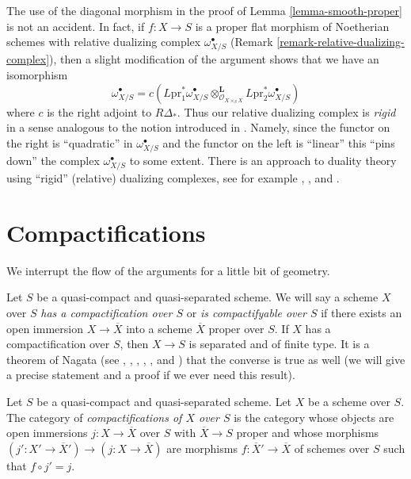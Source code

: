 \begin{remark}
\label{remark-van-den-bergh}
The use of the diagonal morphism in the proof of
Lemma \ref{lemma-smooth-proper} is not an accident.
In fact, if $f : X \to S$ is a proper flat morphism of
Noetherian schemes with relative
dualizing complex $\omega_{X/S}^\bullet$
(Remark \ref{remark-relative-dualizing-complex}), then
a slight modification of the argument shows that
we have
an isomorphism
$$
\omega_{X/S}^\bullet =
c\left(L\text{pr}_1^*\omega_{X/S}^\bullet
\otimes_{\mathcal{O}_{X \times_S X}}^\mathbf{L}
L\text{pr}_2^*\omega_{X/S}^\bullet\right)
$$
where $c$ is the right adjoint to $R\Delta_*$. Thus our relative dualizing
complex is {\it rigid} in a sense analogous to the notion introduced
in \cite{vdB-rigid}. Namely, since the functor on the right
is ``quadratic'' in $\omega_{X/S}^\bullet$ and the functor on the left
is ``linear'' this ``pins down'' the complex $\omega_{X/S}^\bullet$
to some extent. There is an approach to duality theory using
``rigid'' (relative) dualizing complexes, see for example
\cite{Neeman-rigid}, \cite{Yekutieli-rigid}, and \cite{Yekutieli-Zhang}.
\end{remark}









\section{Compactifications}
\label{section-compactify}

\noindent
We interrupt the flow of the arguments for a little bit of geometry.

\medskip\noindent
Let $S$ be a quasi-compact and quasi-separated scheme. We will say a
scheme $X$ over $S$ {\it has a compactification over $S$}
or {\it is compactifyable over $S$} if there exists
an open immersion $X \to \overline{X}$ into a scheme $\overline{X}$
proper over $S$. If $X$ has a compactification over $S$, then $X \to S$
is separated and of finite type. It is a theorem of Nagata (see
\cite{Lutkebohmert}, \cite{Conrad-Nagata}, \cite{Nagata-1},
\cite{Nagata-2}, \cite{Nagata-3}, and \cite{Nagata-4}) that the converse is
true as well (we will give a
precise statement and a proof if we ever need this result).

\medskip\noindent
Let $S$ be a quasi-compact and quasi-separated scheme.
Let $X$ be a scheme over $S$. The category
of {\it compactifications of $X$ over $S$} is the category whose
objects are open immersions $j : X \to \overline{X}$ over $S$ with
$\overline{X} \to S$ proper and whose morphisms
$(j' : X' \to \overline{X}') \to (j : X \to \overline{X})$
are morphisms $f : \overline{X}' \to \overline{X}$ of schemes over $S$
such that $f \circ j' = j$.

